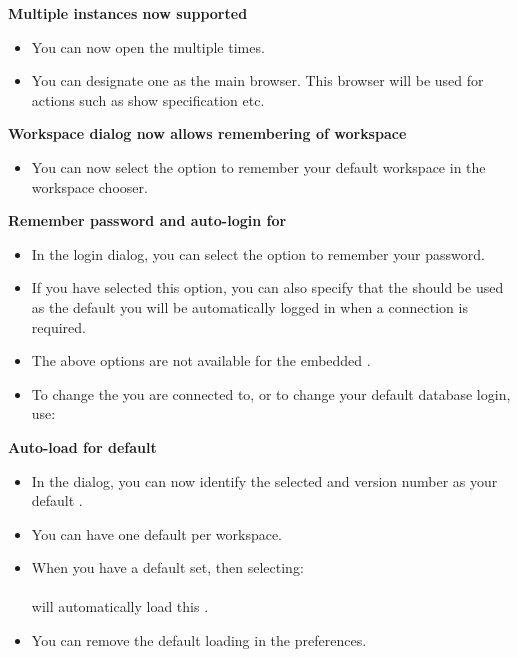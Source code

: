 \textbf{Multiple \gdtestcasebrowser{} instances now supported}
\begin{itemize}
\item You can now open the \gdtestcasebrowser{} multiple times.
\item You can designate one \gdtestcasebrowser{} as the main browser. This browser will be used for actions such as show specification etc.
\end{itemize}

\textbf{Workspace dialog now allows remembering of workspace}
\begin{itemize}
\item You can now select the option to remember your default workspace in the workspace chooser.
\end{itemize}

\textbf{Remember password and auto-login for \gddb{}}
\begin{itemize}
\item In the \gddb{} login dialog, you can select the option to remember your password. 
\item If you have selected this option, you can also specify that the \gddb{} should be used as the default \gddb{} you will be automatically logged in when a \gddb{} connection is required. 
\item The above options are not available for the embedded \gddb{}.
\item To change the \gddb{} you are connected to, or to change your default database login, use:\\
\end{itemize}

\textbf{Auto-load for default \gdproject{}}
\begin{itemize}
\item In the  dialog, you can now identify the selected \gdproject{} and version number as your default \gdproject{}.
\item You can have one default \gdproject{} per workspace. 
\item When you have a default \gdproject{} set, then selecting:\\
\\
will automatically load this \gdproject{}.
\item You can remove the default loading in the  preferences. 
\end{itemize}

